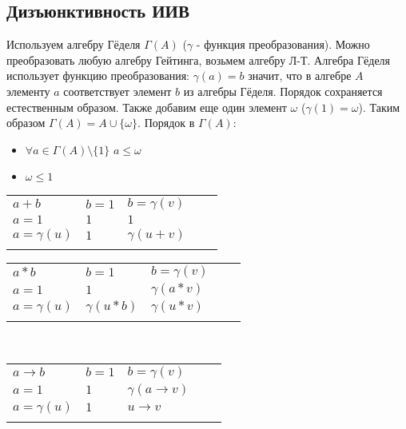\subsection{Дизъюнктивность ИИВ}
\label{sec-5-7}
Используем алгебру Гёделя $\Gamma(A)$ ($\gamma$ - функция преобразования). Можно преобразовать любую алгебру Гейтинга, возьмем алгебру Л-Т. Алгебра Гёделя использует функцию преобразования: $\gamma(a)=b$ значит, что в алгебре $A$ элементу $a$ соответствует элемент $b$ из алгебры Гёделя. Порядок сохраняется естественным образом. Также добавим еще один элемент $\omega$ ($\gamma(1)=\omega$). Таким образом $\Gamma(A) = A \cup \lbrace \omega \rbrace$. Порядок в $\Gamma(A)$:
\begin{itemize}
\item $\forall a \in \Gamma(A) \setminus \lbrace 1 \rbrace$ $a \leq \omega$
\item $\omega \leq 1$
\end{itemize}
\begin{tabular}{lllll}
\cline{1-3}
\multicolumn{1}{|l|}{$a+b$}         & \multicolumn{1}{l|}{$b=1$} & \multicolumn{1}{l|}{$b=\gamma(v)$} &  &  \\ \cline{1-3}
\multicolumn{1}{|l|}{$a=1$}         & \multicolumn{1}{l|}{$1$}   & \multicolumn{1}{l|}{$1$}           &  &  \\ \cline{1-3}
\multicolumn{1}{|l|}{$a=\gamma(u)$} & \multicolumn{1}{l|}{$1$}   & \multicolumn{1}{l|}{$\gamma(u+v)$} &  &  \\ \cline{1-3}
                                    &                            &                                    &  & 
\end{tabular}
\begin{tabular}{lllll}
\cline{1-3}
\multicolumn{1}{|l|}{$a*b$}         & \multicolumn{1}{l|}{$b=1$}         & \multicolumn{1}{l|}{$b=\gamma(v)$} &  &  \\ \cline{1-3}
\multicolumn{1}{|l|}{$a=1$}         & \multicolumn{1}{l|}{$1$}           & \multicolumn{1}{l|}{$\gamma(a*v)$} &  &  \\ \cline{1-3}
\multicolumn{1}{|l|}{$a=\gamma(u)$} & \multicolumn{1}{l|}{$\gamma(u*b)$} & \multicolumn{1}{l|}{$\gamma(u*v)$} &  &  \\ \cline{1-3}
                                    &                                    &                                    &  & 
\end{tabular}\\
\begin{tabular}{lllll}
\cline{1-3}
\multicolumn{1}{|l|}{$a \rightarrow b$} & \multicolumn{1}{l|}{$b=1$} & \multicolumn{1}{l|}{$b=\gamma(v)$}             &  &  \\ \cline{1-3}
\multicolumn{1}{|l|}{$a=1$}             & \multicolumn{1}{l|}{$1$}   & \multicolumn{1}{l|}{$\gamma(a \rightarrow v)$} &  &  \\ \cline{1-3}
\multicolumn{1}{|l|}{$a=\gamma(u)$}     & \multicolumn{1}{l|}{$1$}   & \multicolumn{1}{l|}{$u \rightarrow v$}         &  &  \\ \cline{1-3}
                                        &                            &                                                &  & 
\end{tabular}
